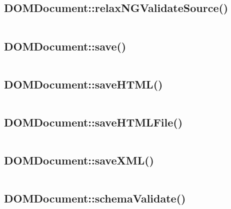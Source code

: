 \subsection{DOMDocument::relaxNGValidateSource()}


\begin{lstlisting}[language=PHP]

\end{lstlisting}


\subsection{DOMDocument::save()}


\begin{lstlisting}[language=PHP]

\end{lstlisting}


\subsection{DOMDocument::saveHTML()}


\begin{lstlisting}[language=PHP]

\end{lstlisting}

\subsection{DOMDocument::saveHTMLFile()}


\begin{lstlisting}[language=PHP]

\end{lstlisting}

\subsection{DOMDocument::saveXML()}


\begin{lstlisting}[language=PHP]

\end{lstlisting}


\subsection{DOMDocument::schemaValidate()}


\begin{lstlisting}[language=PHP]

\end{lstlisting}


